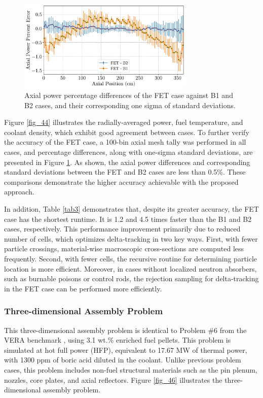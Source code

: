 \begin{figure}
    \centering
    \includegraphics[width=0.75\textwidth]{figs/axial_diff.pdf}
    \caption[Axial power percentage differences of the FET case]{Axial power percentage differences of the FET case against B1 and B2 cases, and their corresponding one sigma of standard deviations.}
    \label{fig_45}
\end{figure}

Figure \ref{fig_44} illustrates the radially-averaged power, fuel temperature, and coolant density, which exhibit good agreement between cases. To further verify the accuracy of the FET case, a 100-bin axial mesh tally was performed in all cases, and percentage differences, along with one-sigma standard deviations, are presented in Figure \ref{fig_45}. As shown, the axial power differences and corresponding standard deviations between the FET and B2 cases are less than 0.5\%. These comparisons demonstrate the higher accuracy achievable with the proposed approach.

In addition, Table \ref{tab3} demonstrates that, despite its greater accuracy, the FET case has the shortest runtime. It is 1.2 and 4.5 times faster than the B1 and B2 cases, respectively. This performance improvement primarily due to reduced number of cells, which optimizes delta-tracking in two key ways. First, with fewer particle crossings, material-wise macroscopic cross-sections are computed less frequently. Second, with fewer cells, the recursive routine for determining particle location is more efficient. Moreover, in cases without localized neutron absorbers, such as burnable poisons or control rods, the rejection sampling for delta-tracking in the FET case can be performed more efficiently.

\subsubsection{Three-dimensional Assembly Problem} \label{3d_asm}

This three-dimensional assembly problem is identical to Problem \#6 from the VERA benchmark \cite{godfrey}, using 3.1 wt.\% enriched fuel pellets. This problem is simulated at hot full power (HFP), equivalent to 17.67 MW of thermal power, with 1300 ppm of boric acid diluted in the coolant. Unlike previous problem cases, this problem includes non-fuel structural materials such as the pin plenum, nozzles, core plates, and axial reflectors. Figure \ref{fig_46} illustrates the three-dimensional assembly problem.

